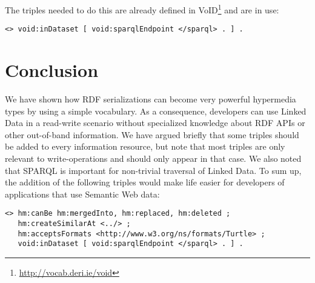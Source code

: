 \documentclass{llncs}
\begin{document}
The triples needed to do this are already defined in
VoID\footnote{\url{http://vocab.deri.ie/void}} and are in use:
\begin{verbatim}
<> void:inDataset [ void:sparqlEndpoint </sparql> . ] .
\end{verbatim}

\section{Conclusion}

We have shown how RDF serializations can become very powerful
hypermedia types by using a simple vocabulary. As a consequence,
developers can use Linked Data in a read-write scenario without
specialized knowledge about RDF APIs or other out-of-band
information. We have argued briefly that some triples should be added
to every information resource, but note that most triples are only
relevant to write-operations and should only appear in that case. We
also noted that SPARQL is important for non-trivial traversal of
Linked Data. To sum up, the addition of the following triples would
make life easier for developers of applications that use Semantic Web
data:

\begin{verbatim}
<> hm:canBe hm:mergedInto, hm:replaced, hm:deleted ;
   hm:createSimilarAt <../> ;
   hm:acceptsFormats <http://www.w3.org/ns/formats/Turtle> ;
   void:inDataset [ void:sparqlEndpoint </sparql> . ] .
\end{verbatim}


%
%

\end{document}

